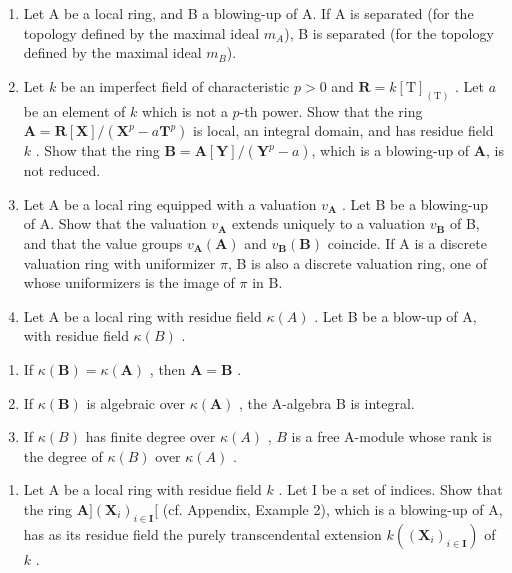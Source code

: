 \begin{enumerate}
\def\labelenumi{\arabic{enumi})}
\setcounter{enumi}{1}
\item
  Let A be a local ring, and B a blowing-up of A. If A is separated (for the topology defined by the maximal ideal \(m_{A}\)), B is separated (for the topology defined by the maximal ideal \(m_{B}\)).
\item
  Let \(k\) be an imperfect field of characteristic \(p > 0\) and \(\mathbf{R} = k[\mathrm{T}]_{(\mathrm{T})}\) . Let \(a\) be an element of \(k\) which is not a \(p\)-th power. Show that the ring \(\mathbf{A} = \mathbf{R}[\mathbf{X}] / (\mathbf{X}^p - a\mathbf{T}^p)\) is local, an integral domain, and has residue field \(k\) . Show that the ring \(\mathbf{B} = \mathbf{A}[\mathbf{Y}] / (\mathbf{Y}^p - a)\), which is a blowing-up of \(\mathbf{A}\), is not reduced.
\item
  Let A be a local ring equipped with a valuation \(v_{\mathbf{A}}\) . Let B be a blowing-up of A. Show that the valuation \(v_{\mathbf{A}}\) extends uniquely to a valuation \(v_{\mathbf{B}}\) of B, and that the value groups \(v_{\mathbf{A}}(\mathbf{A})\) and \(v_{\mathbf{B}}(\mathbf{B})\) coincide. If A is a discrete valuation ring with uniformizer \(\pi\), B is also a discrete valuation ring, one of whose uniformizers is the image of \(\pi\) in B.
\item
  Let A be a local ring with residue field \(\kappa(A)\) . Let B be a blow-up of A, with residue field \(\kappa(B)\) .
\end{enumerate}

\begin{enumerate}
\def\labelenumi{\alph{enumi})}
\item
  If \(\kappa(\mathbf{B}) = \kappa(\mathbf{A})\) , then \(\mathbf{A} = \mathbf{B}\) .
\item
  If \(\kappa(\mathbf{B})\) is algebraic over \(\kappa(\mathbf{A})\) , the A-algebra B is integral.
\item
  If \(\kappa(B)\) has finite degree over \(\kappa(A)\) , \(B\) is a free A-module whose rank is the degree of \(\kappa(B)\) over \(\kappa(A)\) .
\end{enumerate}

\begin{enumerate}
\def\labelenumi{\arabic{enumi})}
\setcounter{enumi}{5}
\tightlist
\item
  Let A be a local ring with residue field \(k\) . Let I be a set of indices. Show that the ring \(\mathbf{A}](\mathbf{X}_i)_{i\in \mathbf{I}}[\) (cf. Appendix, Example 2), which is a blowing-up of A, has as its residue field the purely transcendental extension \(k((\mathbf{X}_i)_{i\in \mathbf{I}})\) of \(k\) .
\end{enumerate}

